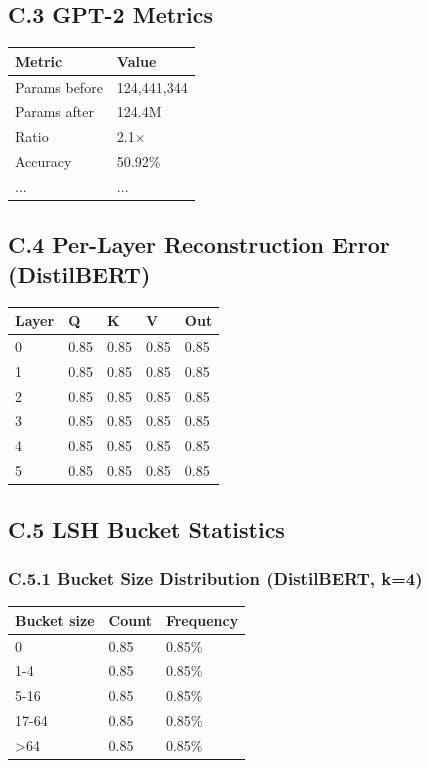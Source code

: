 \subsection{C.3 GPT-2 Metrics}

\begin{table}[H]
\centering
\small
\begin{tabular}{ll}
\toprule
\textbf{Metric} & \textbf{Value} \\
\midrule
Params before & 124,441,344 \\
Params after & 124.4M \\
Ratio & 2.1$\times$ \\
Accuracy & 50.92\% \\
... & ... \\
\bottomrule
\end{tabular}
\end{table}

\subsection{C.4 Per-Layer Reconstruction Error (DistilBERT)}

\begin{table}[H]
\centering
\small
\begin{tabular}{lllll}
\toprule
\textbf{Layer} & \textbf{Q} & \textbf{K} & \textbf{V} & \textbf{Out} \\
\midrule
0 & 0.85 & 0.85 & 0.85 & 0.85 \\
1 & 0.85 & 0.85 & 0.85 & 0.85 \\
2 & 0.85 & 0.85 & 0.85 & 0.85 \\
3 & 0.85 & 0.85 & 0.85 & 0.85 \\
4 & 0.85 & 0.85 & 0.85 & 0.85 \\
5 & 0.85 & 0.85 & 0.85 & 0.85 \\
\bottomrule
\end{tabular}
\end{table}

\subsection{C.5 LSH Bucket Statistics}

\subsubsection{C.5.1 Bucket Size Distribution (DistilBERT, k=4)}

\begin{table}[H]
\centering
\small
\begin{tabular}{lll}
\toprule
\textbf{Bucket size} & \textbf{Count} & \textbf{Frequency} \\
\midrule
0 & 0.85 & 0.85\% \\
1-4 & 0.85 & 0.85\% \\
5-16 & 0.85 & 0.85\% \\
17-64 & 0.85 & 0.85\% \\
\textgreater{}64 & 0.85 & 0.85\% \\
\bottomrule
\end{tabular}
\end{table}

